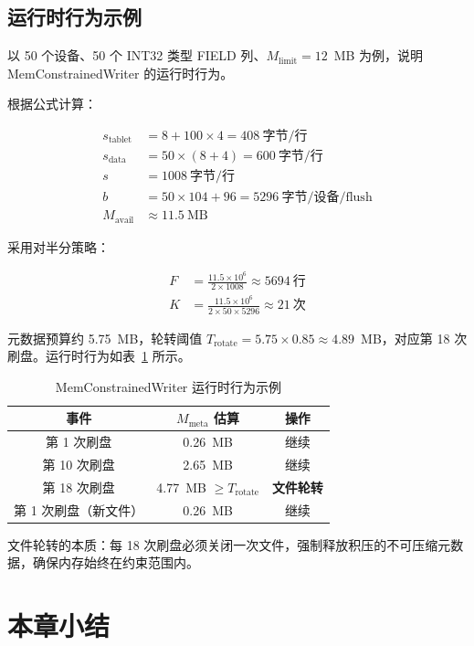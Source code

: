 \subsection{运行时行为示例}

以 50 个设备、50 个 INT32 类型 FIELD 列、$M_{\text{limit}} = 12$~MB 为例，说明 MemConstrainedWriter 的运行时行为。

根据公式计算：

\begin{align*}
  s_{\text{tablet}} &= 8 + 100 \times 4 = 408~\text{字节/行} \\
  s_{\text{data}} &= 50 \times (8 + 4) = 600~\text{字节/行} \\
  s &= 1008~\text{字节/行} \\
  b &= 50 \times 104 + 96 = 5296~\text{字节/设备/flush} \\
  M_{\text{avail}} &\approx 11.5~\text{MB}
\end{align*}

采用对半分策略：

\begin{align*}
  F &= \frac{11.5 \times 10^6}{2 \times 1008} \approx 5694~\text{行} \\
  K &= \frac{11.5 \times 10^6}{2 \times 50 \times 5296} \approx 21~\text{次}
\end{align*}

元数据预算约 5.75~MB，轮转阈值 $T_{\text{rotate}} = 5.75 \times 0.85 \approx 4.89$~MB，对应第 18 次刷盘。运行时行为如表~\ref{tab:runtime-behavior} 所示。

\begin{table}[htbp]
  \centering
  \caption{MemConstrainedWriter 运行时行为示例}
  \label{tab:runtime-behavior}
  \begin{tabular}{ccc}
    \toprule
    事件 & $M_{\text{meta}}$ 估算 & 操作 \\
    \midrule
    第 1 次刷盘 & 0.26~MB & 继续 \\
    第 10 次刷盘 & 2.65~MB & 继续 \\
    第 18 次刷盘 & 4.77~MB $\geq T_{\text{rotate}}$ & \textbf{文件轮转} \\
    第 1 次刷盘（新文件） & 0.26~MB & 继续 \\
    \bottomrule
  \end{tabular}
\end{table}

文件轮转的本质：每 18 次刷盘必须关闭一次文件，强制释放积压的不可压缩元数据，确保内存始终在约束范围内。


\section{本章小结}

